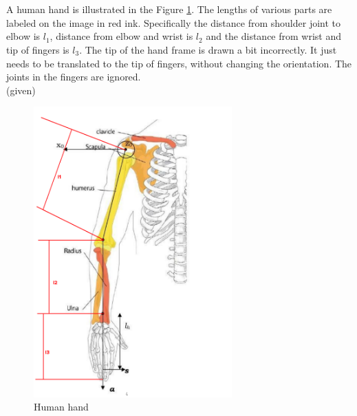 \documentclass[12pt]{article}
\newcommand{\given}{{\\ \color{blue} \hspace*{\fill}(given)} \\}
\begin{document}
\pagebreak

\section{}
A human hand is illustrated in the Figure \ref{fig:q4.1}.
The lengths of various parts are labeled on the image in red ink.
Specifically the distance from shoulder joint to elbow is $l_1$, distance from elbow and wrist is $l_2$ and the distance from wrist and tip of fingers is $l_3$.
The tip of the hand frame is drawn a bit incorrectly. It just needs to be translated to the tip of fingers, without changing the orientation.
The joints in the fingers are ignored.
\given
\begin{figure}[h]
  \centering
  \includegraphics[width=0.68\textwidth]{q4.png}
  \caption{Human hand}
  \label{fig:q4.1}
\end{figure}
\end{document}
